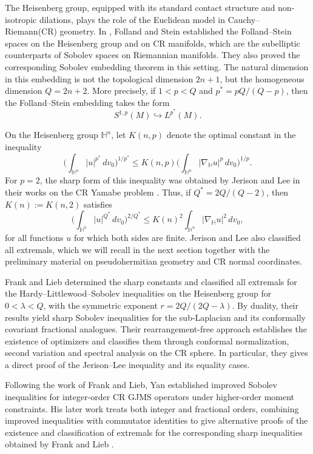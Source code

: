 \documentclass[11pt]{article}
\numberwithin{equation}{section}
\newcounter{problem}
\numberwithin{equation}{section}
\begin{document}
	The Heisenberg group, equipped with its standard contact structure and non-isotropic dilations, plays the role of the Euclidean model in Cauchy--Riemann(CR) geometry. In \cite{FS1974}, Folland and Stein established the Folland--Stein spaces on the Heisenberg group and on CR manifolds, which are the subelliptic counterparts of Sobolev spaces on Riemannian manifolds. They also proved the corresponding Sobolev embedding theorem in this setting. The natural dimension in this embedding is not the topological dimension \(2n+1\), but the homogeneous dimension \(Q=2n+2\). More precisely, if \(1<p<Q\) and \(p^*=pQ/(Q-p)\), then the Folland--Stein embedding takes the form
	\[
	S^{1,p}(M)\hookrightarrow L^{p^*}(M).
	\]
	
	On the Heisenberg group \(\mathbb{H}^n\), let \(K(n,p)\) denote the optimal constant in the inequality
	\[
	\Big(\int_{\mathbb H^n}|u|^{p^*}\,dv_0\Big)^{1/p^*} \leq K(n,p) \Big(\int_{\mathbb H^n}|\nabla_{\mathbb H}u|^p\,dv_0\Big)^{1/p}.
	\]
	For \(p=2\), the sharp form of this inequality was obtained by Jerison and Lee in their works on the CR Yamabe problem \cite{JL1987,JL1988,JL1989}. Thus, if \(Q^*=2Q/(Q-2)\), then \(K(n):=K(n,2)\) satisfies
	\[
	\Big(\int_{\mathbb H^n}|u|^{Q^*}\,dv_0\Big)^{2/Q^*} \leq K(n)^2\int_{\mathbb H^n}|\nabla_{\mathbb H}u|^2\,dv_0,
	\]
	for all functions \(u\) for which both sides are finite. Jerison and Lee also classified all extremals, which we will recall in the next section together with the preliminary material on pseudohermitian geometry and CR normal coordinates.

	Frank and Lieb \cite{FL2012} determined the sharp constants and classified all extremals for the Hardy--Littlewood--Sobolev inequalities on the Heisenberg group for \(0<\lambda<Q\), with the symmetric exponent \(r=2Q/(2Q-\lambda)\). By duality, their results yield sharp Sobolev inequalities for the sub-Laplacian and its conformally covariant fractional analogues. Their rearrangement-free approach establishes the existence of optimizers and classifies them through conformal normalization, second variation and spectral analysis on the CR sphere. In particular, they gives a direct proof of the Jerison--Lee inequality and its equality cases.

	Following the work of Frank and Lieb, Yan \cite{Y2023} established improved Sobolev inequalities for integer-order CR GJMS operators under higher-order moment constraints. His later work \cite{Y2025} treats both integer and fractional orders, combining improved inequalities with commutator identities to give alternative proofs of the existence and classification of extremals for the corresponding sharp inequalities obtained by Frank and Lieb \cite{FL2012}.
\end{document}
